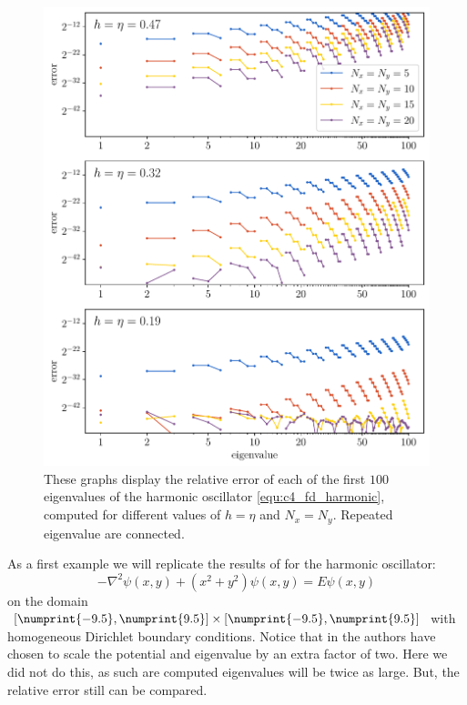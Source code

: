 \begin{figure}
    \begin{center}
        \includegraphics[width=\textwidth]{img/chapter4/fd_harmonic.pdf}
    \end{center}
    \caption{These graphs display the relative error of each of the first $100$ eigenvalues of the harmonic oscillator \eqref{equ:c4_fd_harmonic}, computed for different values of $h = \eta$ and $N_x = N_y$. Repeated eigenvalue are connected.}
    \label{fig:c4_fd_harmonic}
\end{figure}

As a first example we will replicate the results of \cite{wang_new_2009} for the harmonic oscillator:
\begin{equation}\label{equ:c4_fd_harmonic}
    -\nabla^2 \psi(x, y) + \left(x^2 + y^2\right) \psi(x, y) = E \psi(x, y)
\end{equation}
on the domain $[\numprint{-9.5}, \numprint{9.5}] \times [\numprint{-9.5}, \numprint{9.5}]$ with homogeneous Dirichlet boundary conditions. Notice that in \cite{wang_new_2009} the authors have chosen to scale the potential and eigenvalue by an extra factor of two. Here we did not do this, as such are computed eigenvalues will be twice as large. But, the relative error still can be compared.


